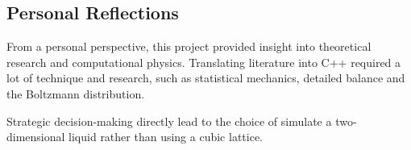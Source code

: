 \documentclass[11pt,a4paper]{article}
\begin{document}
    \subsection{Personal Reflections}
    From a personal perspective, this project provided insight into theoretical research and computational physics.
    Translating literature into C++ required a lot of technique and research, such as statistical mechanics, detailed balance and the Boltzmann distribution.
    
    Strategic decision-making directly lead to the choice of simulate a two-dimensional liquid rather than using a cubic lattice.


\newpage



\nocite{*}

\end{document}
